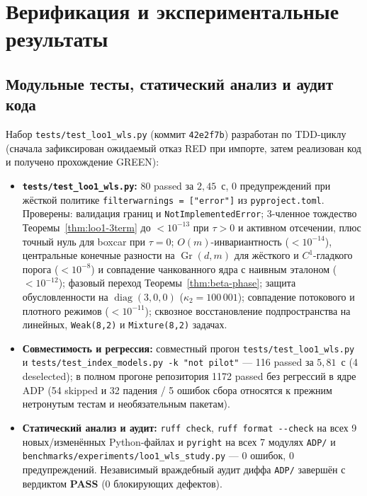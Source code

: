 \documentclass[11pt,a4paper]{article}
\numberwithin{equation}{section}
\theoremstyle{definition}
\theoremstyle{remark}
\newcommand{\diag}{\operatorname{diag}}
\newcommand{\Gr}{\operatorname{Gr}}
\newcommand{\code}[1]{\nolinkurl{#1}}
\begin{document}
\section{Верификация и экспериментальные результаты}
\label{sec:results}

\subsection{Модульные тесты, статический анализ и аудит кода}
\label{sec:unit-tests}

Набор \code{tests/test_loo1_wls.py} (коммит \code{42e2f7b}) разработан по TDD-циклу
(сначала зафиксирован ожидаемый отказ RED при импорте, затем реализован код и получено прохождение GREEN):
\begin{itemize}
  \item \textbf{\code{tests/test_loo1_wls.py}:} 80 passed за $2{,}45$~с, 0 предупреждений
  при жёсткой политике \code{filterwarnings = ["error"]} из \code{pyproject.toml}.
  Проверены: валидация границ и \code{NotImplementedError}; 3-членное тождество Теоремы~\ref{thm:loo1-3term}
  до $< 10^{-13}$ при $\tau > 0$ и активном отсечении, плюс точный нуль для boxcar при $\tau=0$;
  $O(m)$-инвариантность ($< 10^{-14}$), центральные конечные разности на $\Gr(d,m)$
  для жёсткого и $C^1$-гладкого порога ($< 10^{-8}$) и совпадение чанкованного ядра
  с наивным эталоном ($< 10^{-12}$); фазовый переход Теоремы~\ref{thm:beta-phase};
  защита обусловленности на $\diag(3,0,0)$ ($\kappa_2 = 100\,001$);
  совпадение потокового и плотного режимов ($< 10^{-11}$); сквозное восстановление подпространства
  на линейных, \texttt{Weak(8,2)} и \texttt{Mixture(8,2)} задачах.
  \item \textbf{Совместимость и регрессия:} совместный прогон \code{tests/test_loo1_wls.py}
  и \code{tests/test_index_models.py -k "not pilot"} — 116 passed за $5{,}81$~с (4 deselected);
  в полном прогоне репозитория 1172 passed без регрессий в ядре ADP
  (54 skipped и 32 падения / 5 ошибок сбора относятся к прежним нетронутым тестам и необязательным пакетам).
  \item \textbf{Статический анализ и аудит:} \code{ruff check}, \code{ruff format --check}
  на всех 9 новых/изменённых Python-файлах и \code{pyright} на всех 7 модулях \code{ADP/} и
  \code{benchmarks/experiments/loo1_wls_study.py} — 0 ошибок, 0 предупреждений.
  Независимый враждебный аудит диффа \code{ADP/} завершён с вердиктом \textbf{PASS} (0 блокирующих дефектов).
\end{itemize}
\end{document}

